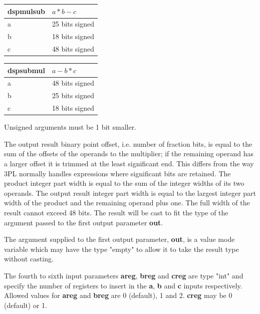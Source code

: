             \begin{tabular}{| l l |}
            \hline
            dspmulsub & $ a * b - c $ \\
            \hline
            a & 25 bits signed \\
            b & 18 bits signed \\
            c & 48 bits signed \\
            \hline
            \end{tabular}

            \begin{tabular}{| l l |}
            \hline
            dspsubmul & $ a - b * c $ \\
            \hline
            a & 48 bits signed \\
            b & 25 bits signed \\
            c & 18 bits signed \\
            \hline
            \end{tabular}

            Unsigned arguments must be 1 bit smaller.

            The output result binary point offset, i.e. number of fraction bits,
            is equal to the sum of the offsets of the operands to the
            multiplier; if the remaining operand has a larger offset it is
            trimmed at the least significant end. This differs from the way 3PL
            normally handles expressions where significant bits are retained.
            The product integer part width is equal to the sum of the integer
            widths of its two operands. The output result integer part width is
            equal to the largest integer part width of the product and the
            remaining operand plus one. The full width of the result cannot
            exceed 48 bits. The result will be cast to fit the type of the
            argument passed to the first output parameter {\bf out}.

            The argument supplied to the first output parameter, {\bf out}, is a
            value mode variable which may have the type "empty" to allow it
            to take the result type without casting.

            The fourth to sixth input parameters {\bf areg}, {\bf breg} and {\bf
            creg} are type "int" and specify the number of registers to insert
            in the {\bf a}, {\bf b} and {\bf c} inputs respectively. Allowed
            values for {\bf areg} and {\bf breg} are 0 (default), 1 and 2.
            {\bf creg} may be 0 (default) or 1.

